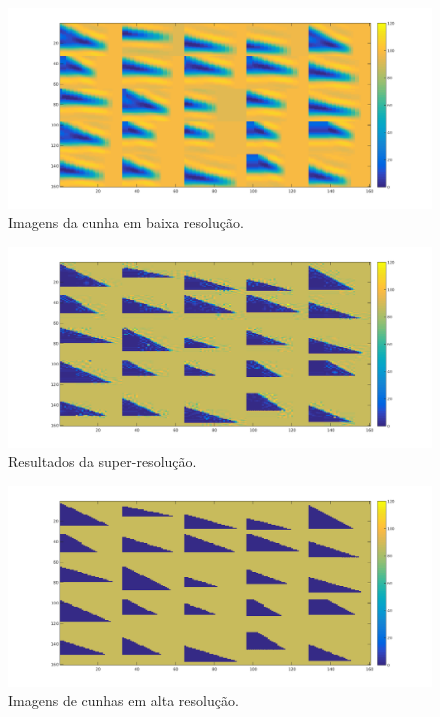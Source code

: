 \begin{figure}[htp]
  \centering
  \includegraphics[width=.7\linewidth]{fig/cunha_pixel_lr}
  \caption{Imagens da cunha em baixa resolução.}
  \label{fig:cunha_pixel_lr}
\end{figure}

\begin{figure}
  \centering
  \includegraphics[width=.7\linewidth]{fig/result_cunha_pixel}
  \caption{Resultados da super-resolução.}
  \label{fig:result_cunha_pixel}
\end{figure}%

\begin{figure}
  \centering
  \includegraphics[width=.7\linewidth]{fig/cunha_pixel_hr}
  \caption{Imagens de cunhas em alta resolução.}
  \label{fig:cunha_pixel_hr}
\end{figure}

